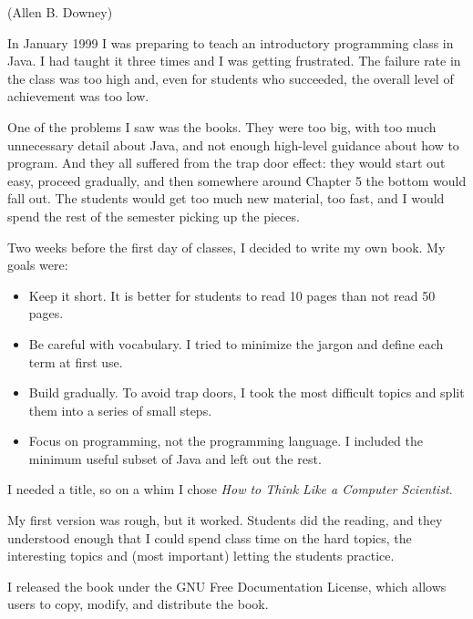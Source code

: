 \documentclass[11pt]{book}
\begin{document}
(Allen B. Downey)

In January 1999 I was preparing to teach an introductory programming
class in Java.  I had taught it three times and I was getting
frustrated.  The failure rate in the class was too high and, even for
students who succeeded, the overall level of achievement was too low.

One of the problems I saw was the books.  
They were too big, with too much unnecessary detail about Java, and
not enough high-level guidance about how to program.  And they all
suffered from the trap door effect: they would start out easy,
proceed gradually, and then somewhere around Chapter 5 the bottom would
fall out.  The students would get too much new material, too fast,
and I would spend the rest of the semester picking up the pieces.

Two weeks before the first day of classes, I decided to write my
own book.  
My goals were:

\begin{itemize}

\item Keep it short.  It is better for students to read 10 pages
than not read 50 pages.

\item Be careful with vocabulary.  I tried to minimize the jargon
and define each term at first use.

\item Build gradually. To avoid trap doors, I took the most difficult
topics and split them into a series of small steps. 

\item Focus on programming, not the programming language.  I included
the minimum useful subset of Java and left out the rest.

\end{itemize}

I needed a title, so on a whim I chose \emph{How to Think Like
a Computer Scientist}.

My first version was rough, but it worked.  Students did the reading,
and they understood enough that I could spend class time on the hard
topics, the interesting topics and (most important) letting the
students practice.

I released the book under the GNU Free Documentation License,
which allows users to copy, modify, and distribute the book.

\end{document}
